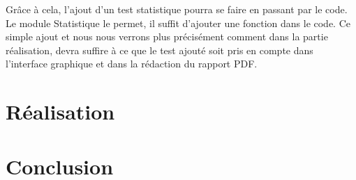 \documentclass[a4paper,10pt]{report}
\begin{document}
Grâce à cela, l'ajout d'un test statistique pourra se faire en passant par le code. Le module Statistique le permet, il suffit d'ajouter une fonction dans le code.
Ce simple ajout et nous nous verrons plus précisément comment dans la partie réalisation, devra suffire à ce que le test ajouté soit pris en compte dans l'interface graphique et dans la rédaction du rapport PDF.


\chapter{Réalisation}


\chapter*{Conclusion}


 
\end{document}
